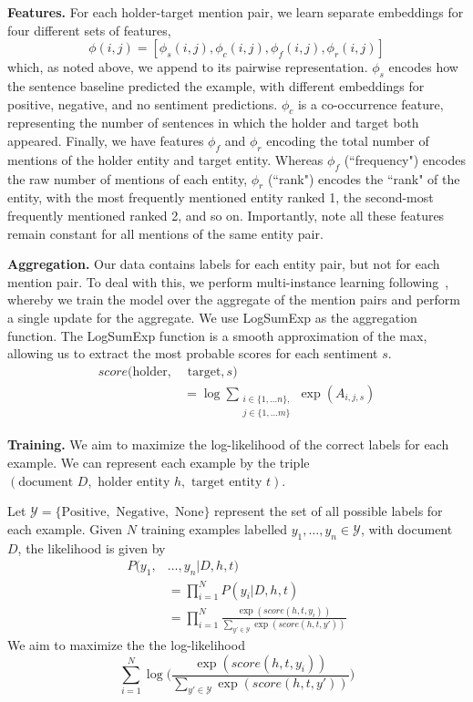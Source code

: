\documentclass[11pt,a4paper]{article}
\begin{document}
\noindent\textbf{Features.}
For each holder-target mention pair, we learn separate embeddings for four different sets of features,
	$$\phi(i, j) = [\phi_s(i, j),  \phi_c(i, j), \phi_f(i, j), \phi_r(i, j)]$$
which, as noted above, we append to its pairwise representation.
$\phi_s$ encodes how the sentence baseline predicted the example, with different embeddings for positive, negative, and no sentiment predictions.
$\phi_c$ is a co-occurrence feature, representing the number of sentences in which the holder and target both appeared.
Finally, we have features $\phi_f$ and $\phi_r$ encoding the total number of mentions of the holder entity and target entity.
Whereas $\phi_f$ (``frequency") encodes the raw number of mentions of each entity, $\phi_r$ (``rank") encodes the ``rank" of the entity, with the most frequently mentioned entity ranked 1, the second-most frequently mentioned ranked 2, and so on.
Importantly, note all these features remain constant for all mentions of the same entity pair.

\noindent\textbf{Aggregation.}
Our data contains labels for each entity pair, but not for each mention pair.
To deal with this, we perform multi-instance learning following~, whereby we train the model over the aggregate of the mention pairs and perform a single update for the aggregate.
We use LogSumExp as the aggregation function. The LogSumExp function is a smooth approximation of the max, allowing us to extract the most probable scores for each sentiment $s$.
\begin{align*}
	score(\text{holder}, & \text{ target}, s) \\
	& = \log\sum_{\substack{i\in \{1,\dots n\},\\ j\in \{1,\dots m\}}}\exp{(A_{i, j, s})}
\end{align*}

\noindent\textbf{Training.}
We aim to maximize the log-likelihood of the correct labels for each example.
We can represent each example by the triple $(\text{document }D, \text{ holder entity }h, \text{ target entity }t)$.
\par Let $\mathcal{Y} = \{\text{Positive}, \text{ Negative}, \text{ None}\}$ represent the set of all possible labels for each example.
Given $N$ training examples labelled $y_1,\dots, y_n\in \mathcal{Y}$, with document $D$, the likelihood is given by
\begin{align*}
	P(y_1, & \dots, y_n | D, h, t) \\
	& = \prod_{i=1}^N P(y_i | D, h, t) \\
	& = \prod_{i=1}^N \frac{\exp{(score(h, t, y_i))}}{\sum_{y'\in \mathcal{Y}} \exp{(score(h, t, y'))}}
\end{align*}
We aim to maximize the the log-likelihood
	$$\sum_{i=1}^N \log{\Big(\frac{\exp{(score(h, t, y_i))}}{\sum_{y'\in \mathcal{Y}} \exp{(score(h, t, y'))}}\Big)}$$
\end{document}
